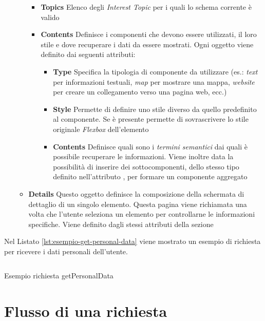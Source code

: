 \begin{itemize}
\begin{itemize}
		\begin{itemize}
			\item \textbf{Topics}
			Elenco degli \emph{Interest Topic} per i quali lo schema corrente è valido
			\item \textbf{Contents}
			Definisce i componenti che devono essere utilizzati, il loro stile e dove recuperare i dati da essere mostrati. Ogni oggetto viene definito dai seguenti attributi:
			\begin{itemize}
				\item \textbf{Type}
				Specifica la tipologia di componente da utilizzare (es.: \emph{text} per informazioni testuali, \emph{map} per mostrare una mappa, \emph{website} per creare un collegamento verso una pagina web, ecc.)
				\item \textbf{Style}
				Permette di definire uno stile diverso da quello predefinito al componente. Se è presente permette di sovrascrivere lo stile originale \emph{Flexbox} dell'elemento
				\item \textbf{Contents}
				Definisce quali sono i \emph{termini semantici} dai quali è possibile recuperare le informazioni. Viene inoltre data la possibilità di inserire dei sottocomponenti, dello stesso tipo definito nell'attributo , per formare un componente aggregato
			\end{itemize}
		\end{itemize}	
		\item \textbf{Details}
		Questo oggetto definisce la composizione della schermata di dettaglio di un singolo elemento. Questa pagina viene richiamata una volta che l'utente seleziona un elemento per controllarne le informazioni specifiche. Viene definito dagli stessi attributi della sezione 			
	\end{itemize}
\end{itemize}

Nel Listato \ref{lst:esempio-get-personal-data} viene mostrato un esempio di richiesta per ricevere i dati personali dell'utente.

\begin{listing}[H]
	\inputminted{text}{5-implementazione-backend/Codice/esempio_get_personal_data.graphql}
	\caption{Esempio richiesta getPersonalData}
	\label{lst:esempio-get-personal-data}
\end{listing}

\section{Flusso di una richiesta\label{sec:flusso-richiesta-server}}

